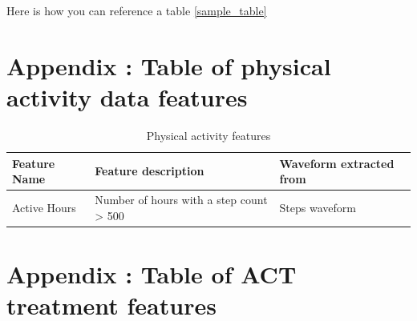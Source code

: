 \documentclass{article}
\begin{document}
Here is how you can reference a table \ref{sample_table}




\appendix
\section{Appendix : Table of physical activity data features}

\begin{table}[h]
  \caption{Physical activity features}
  \label{fitbit_features}
  \centering
  \begin{tabular}{ |l|l|l| }
    \toprule
    \cmidrule(r){1-2}
    \textbf{Feature Name} & \textbf{Feature description} & \textbf{Waveform extracted from} \\
    \midrule
    Active Hours & Number of hours with a step count > 500 & Steps waveform \\
    \bottomrule
    \end{tabular}
\end{table}

\appendix
\section{Appendix : Table of ACT treatment features}
\end{document}
